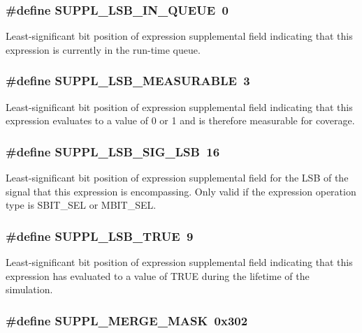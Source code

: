 \subsubsection{\setlength{\rightskip}{0pt plus 5cm}\#define SUPPL\_\-LSB\_\-IN\_\-QUEUE\ 0}\label{group__expr__suppl_a0}


Least-significant bit position of expression supplemental field indicating that this expression is currently in the run-time queue. 
\subsubsection{\setlength{\rightskip}{0pt plus 5cm}\#define SUPPL\_\-LSB\_\-MEASURABLE\ 3}\label{group__expr__suppl_a3}


Least-significant bit position of expression supplemental field indicating that this expression evaluates to a value of 0 or 1 and is therefore measurable for coverage. 
\subsubsection{\setlength{\rightskip}{0pt plus 5cm}\#define SUPPL\_\-LSB\_\-SIG\_\-LSB\ 16}\label{group__expr__suppl_a6}


Least-significant bit position of expression supplemental field for the LSB of the signal that this expression is encompassing. Only valid if the expression operation type is SBIT\_\-SEL or MBIT\_\-SEL. 
\subsubsection{\setlength{\rightskip}{0pt plus 5cm}\#define SUPPL\_\-LSB\_\-TRUE\ 9}\label{group__expr__suppl_a5}


Least-significant bit position of expression supplemental field indicating that this expression has evaluated to a value of TRUE during the lifetime of the simulation. 
\subsubsection{\setlength{\rightskip}{0pt plus 5cm}\#define SUPPL\_\-MERGE\_\-MASK\ 0x302}\label{group__expr__suppl_a7}


